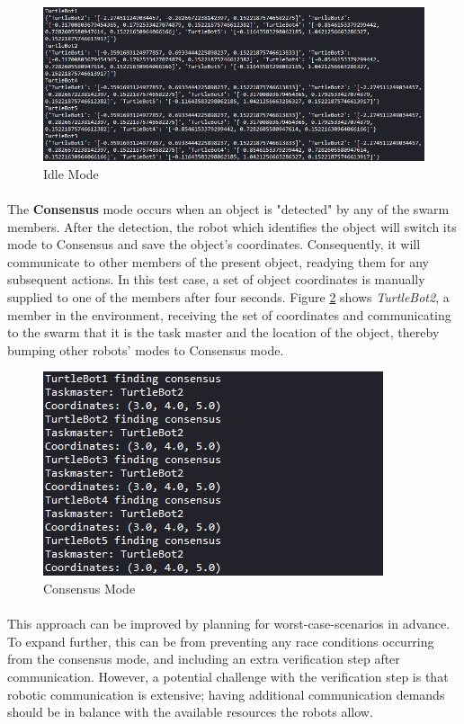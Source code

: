 \begin{figure}[H]
    \centering
    \includegraphics[width=1\linewidth]{assets/images/communication/outputs/idle_mode.png}
    \caption{Idle Mode}
    \label{fig:idle_mode}
\end{figure}

\paragraph*{}
The \textbf{Consensus} mode occurs when an object is "detected" by any of the swarm members. After the detection, the robot which identifies the object will switch its mode to Consensus and save the object's coordinates. Consequently, it will communicate to other members of the present object, readying them for any subsequent actions. In this test case, a set of object coordinates is manually supplied to one of the members after four seconds. Figure \ref{fig:consensus_mode} shows \textit{TurtleBot2}, a member in the environment, receiving the set of coordinates and communicating to the swarm that it is the task master and the location of the object, thereby bumping other robots' modes to Consensus mode.

\begin{figure}[H]
    \centering
    \includegraphics[width=0.6\linewidth]{assets/images/communication/outputs/consensus_mode.png}
    \caption{Consensus Mode}
    \label{fig:consensus_mode}
\end{figure}

\paragraph*{}
This approach can be improved by planning for worst-case-scenarios in advance. To expand further, this can be from preventing any race conditions occurring from the consensus mode, and including an extra verification step after communication. However, a potential challenge with the verification step is that robotic communication is extensive; having additional communication demands should be in balance with the available resources the robots allow.

